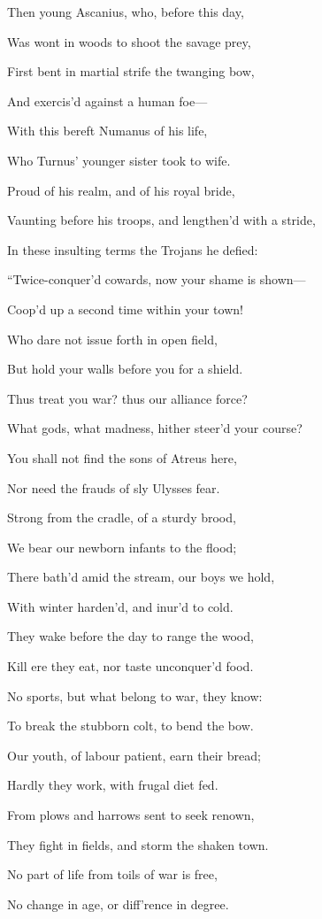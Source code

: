 Then young Ascanius, who, before this day,

Was wont in woods to shoot the savage prey,

First bent in martial strife the twanging bow,

And exercis’d against a human foe—

With this bereft Numanus of his life,

Who Turnus’ younger sister took to wife.

Proud of his realm, and of his royal bride,

Vaunting before his troops, and lengthen’d with a stride,

In these insulting terms the Trojans he defied:

“Twice-conquer’d cowards, now your shame is shown—

Coop’d up a second time within your town!

Who dare not issue forth in open field,

But hold your walls before you for a shield.

Thus treat you war? thus our alliance force?

What gods, what madness, hither steer’d your course?

You shall not find the sons of Atreus here,

Nor need the frauds of sly Ulysses fear.

Strong from the cradle, of a sturdy brood,

We bear our newborn infants to the flood;

There bath’d amid the stream, our boys we hold,

With winter harden’d, and inur’d to cold.

They wake before the day to range the wood,

Kill ere they eat, nor taste unconquer’d food.

No sports, but what belong to war, they know:

To break the stubborn colt, to bend the bow.

Our youth, of labour patient, earn their bread;

Hardly they work, with frugal diet fed.

From plows and harrows sent to seek renown,

They fight in fields, and storm the shaken town.

No part of life from toils of war is free,

No change in age, or diff’rence in degree.

